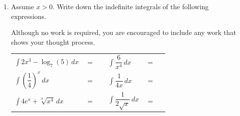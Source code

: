 \documentclass[11pt]{article}
\begin{document}
\begin{enumerate}
Find the value of the following definite integrals.

\begin{enumerate}
    \item $\displaystyle\int_3^9 f(x)\,dx$

    \vfill

    \item $\displaystyle\int_{9}^{3}g(x)\,dx$

    \vfill
\end{enumerate}


\newpage


\item Assume $x>0$. Write down the indefinite integrals of the following expressions. 

Although no work is required, you are encouraged to include any work that shows your thought process. 


\begin{center}
        \begin{tabular}{l c r l c r}
            $\displaystyle\int 2x^3-\log_7(5)\,dx$ & $=$ & \rule[-8pt]{1.5in}{0.4pt} &
            $\displaystyle\int \dfrac{6}{x^4} \,dx$ & $=$ & \rule[-8pt]{1.5in}{0.4pt}\\[1in]
            $\displaystyle\int \left(\dfrac{1}{4}\right)^x\,dx$ & $=$ & \rule[-8pt]{1.5in}{0.4pt}&
            $\displaystyle\int \dfrac{1}{4x}\,dx$ & $=$ & \rule[-8pt]{1.5in}{0.4pt}\\[1in]
            $\displaystyle\int 4e^x+ \sqrt[3]{x^4}\,dx$ & $=$ & \rule[-8pt]{1.5in}{0.4pt} & 
            $\displaystyle\int \dfrac{1}{2\sqrt{x}} \,dx$ & $=$ & \rule[-8pt]{1.5in}{0.4pt}\\[0.3in]
        \end{tabular}
\end{center}


\end{enumerate}
\end{document}
